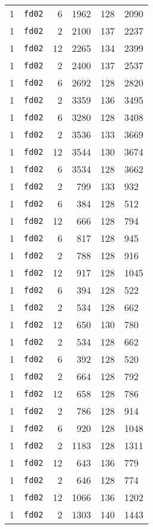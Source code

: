 \documentclass{article}
\begin{document}
\begin{table}[h!]
\begin{tabular}{llrrrl}
    1 & \texttt{fd02} & 6 & 1962 & 128 & 2090 \\
    1 & \texttt{fd02} & 2 & 2100 & 137 & 2237 \\
    1 & \texttt{fd02} & 12 & 2265 & 134 & 2399 \\
    1 & \texttt{fd02} & 2 & 2400 & 137 & 2537 \\
    1 & \texttt{fd02} & 6 & 2692 & 128 & 2820 \\
    1 & \texttt{fd02} & 2 & 3359 & 136 & 3495 \\
    1 & \texttt{fd02} & 6 & 3280 & 128 & 3408 \\
    1 & \texttt{fd02} & 2 & 3536 & 133 & 3669 \\
    1 & \texttt{fd02} & 12 & 3544 & 130 & 3674 \\
    1 & \texttt{fd02} & 6 & 3534 & 128 & 3662 \\
    1 & \texttt{fd02} & 2 & 799 & 133 & 932 \\
    1 & \texttt{fd02} & 6 & 384 & 128 & 512 \\
    1 & \texttt{fd02} & 12 & 666 & 128 & 794 \\
    1 & \texttt{fd02} & 6 & 817 & 128 & 945 \\
    1 & \texttt{fd02} & 2 & 788 & 128 & 916 \\
    1 & \texttt{fd02} & 12 & 917 & 128 & 1045 \\
    1 & \texttt{fd02} & 6 & 394 & 128 & 522 \\
    1 & \texttt{fd02} & 2 & 534 & 128 & 662 \\
    1 & \texttt{fd02} & 12 & 650 & 130 & 780 \\
    1 & \texttt{fd02} & 2 & 534 & 128 & 662 \\
    1 & \texttt{fd02} & 6 & 392 & 128 & 520 \\
    1 & \texttt{fd02} & 2 & 664 & 128 & 792 \\
    1 & \texttt{fd02} & 12 & 658 & 128 & 786 \\
    1 & \texttt{fd02} & 2 & 786 & 128 & 914 \\
    1 & \texttt{fd02} & 6 & 920 & 128 & 1048 \\
    1 & \texttt{fd02} & 2 & 1183 & 128 & 1311 \\
    1 & \texttt{fd02} & 12 & 643 & 136 & 779 \\
    1 & \texttt{fd02} & 2 & 646 & 128 & 774 \\
    1 & \texttt{fd02} & 12 & 1066 & 136 & 1202 \\
    1 & \texttt{fd02} & 2 & 1303 & 140 & 1443 \\

\end{tabular}
\end{table}
\end{document}
